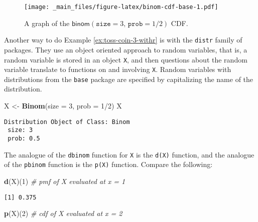 \documentclass[]{book}
\newenvironment{Shaded}{\begin{snugshade}}{\end{snugshade}}
\newcommand{\KeywordTok}[1]{\textcolor[rgb]{0.13,0.29,0.53}{\textbf{{#1}}}}
\newcommand{\DataTypeTok}[1]{\textcolor[rgb]{0.13,0.29,0.53}{{#1}}}
\newcommand{\DecValTok}[1]{\textcolor[rgb]{0.00,0.00,0.81}{{#1}}}
\newcommand{\StringTok}[1]{\textcolor[rgb]{0.31,0.60,0.02}{{#1}}}
\newcommand{\CommentTok}[1]{\textcolor[rgb]{0.56,0.35,0.01}{\textit{{#1}}}}
\newcommand{\NormalTok}[1]{{#1}}
\numberwithin{equation}{chapter}
\numberwithin{figure}{chapter}
\theoremstyle{plain}
\theoremstyle{definition}
\theoremstyle{remark}
\theoremstyle{definition}
\theoremstyle{definition}
\theoremstyle{remark}
\let\BeginKnitrBlock\begin \let\EndKnitrBlock\end
\begin{document}
\begin{figure}[htbp]
\centering
\texttt{[image: \_main\_files/figure-latex/binom-cdf-base-1.pdf]}
\caption{\label{fig:binom-cdf-base}\small A graph of the
\(\mathsf{binom}(\mathtt{size}=3,\,\mathtt{prob}=1/2)\) CDF.}
\end{figure}




\bigskip

\BeginKnitrBlock{example}
\protect\hypertarget{ex:unnamed-chunk-210}{}{\label{ex:unnamed-chunk-210}}Another
way to do Example \ref{ex:toss-coin-3-withr} is with the \texttt{distr}
family of packages. They use an object oriented approach to random
variables, that is, a random variable is stored in an object \texttt{X},
and then questions about the random variable translate to functions on
and involving \texttt{X}. Random variables with distributions from the
\texttt{base} package are specified by capitalizing the name of the
distribution.
\EndKnitrBlock{example}

\begin{Shaded}
\begin{Highlighting}[]
\NormalTok{X <-}\StringTok{ }\KeywordTok{Binom}\NormalTok{(}\DataTypeTok{size =} \DecValTok{3}\NormalTok{, }\DataTypeTok{prob =} \DecValTok{1}\NormalTok{/}\DecValTok{2}\NormalTok{)}
\NormalTok{X}
\end{Highlighting}
\end{Shaded}

\begin{verbatim}
Distribution Object of Class: Binom
 size: 3
 prob: 0.5
\end{verbatim}

The analogue of the \texttt{dbinom} function for \texttt{X} is the
\texttt{d(X)} function, and the analogue of the \texttt{pbinom} function
is the \texttt{p(X)} function. Compare the following:

\begin{Shaded}
\begin{Highlighting}[]
\KeywordTok{d}\NormalTok{(X)(}\DecValTok{1}\NormalTok{)   }\CommentTok{# pmf of X evaluated at x = 1}
\end{Highlighting}
\end{Shaded}

\begin{verbatim}
[1] 0.375
\end{verbatim}

\begin{Shaded}
\begin{Highlighting}[]
\KeywordTok{p}\NormalTok{(X)(}\DecValTok{2}\NormalTok{)   }\CommentTok{# cdf of X evaluated at x = 2}
\end{Highlighting}
\end{Shaded}
\end{document}
